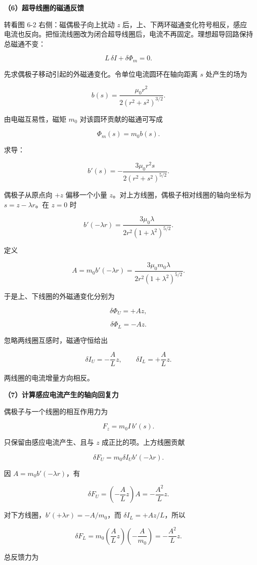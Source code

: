 \documentclass[12pt,a4paper,UTF8]{ctexart}
\begin{document}
\textbf{（6）超导线圈的磁通反馈}

转看图 6-2 右侧：磁偶极子向上扰动 \(z\)
后，上、下两环磁通变化符号相反，感应电流也反向。把恒流线圈改为闭合超导线圈后，电流不再固定。理想超导回路保持总磁通不变：

\[L\,\delta I+\delta\Phi_m=0.\]

先求偶极子移动引起的外磁通变化。令单位电流圆环在轴向距离 \(s\)
处产生的场为

\[
b(s)=\frac{\mu_0r^2}{2(r^2+s^2)^{3/2}}.
\]

由电磁互易性，磁矩 \(m_0\) 对该圆环贡献的磁通可写成

\[\Phi_m(s)=m_0b(s).\]

求导：

\[
b'(s)=-\frac{3\mu_0r^2s}
{2(r^2+s^2)^{5/2}}.
\]

偶极子从原点向 \(+z\) 偏移一个小量
\(z\)。对上方线圈，偶极子相对线圈的轴向坐标为 \(s=z-\lambda r\)。在
\(z=0\) 时

\[
b'(-\lambda r)
=\frac{3\mu_0\lambda}
{2r^2(1+\lambda^2)^{5/2}}.
\]

定义

\[
A=m_0b'(-\lambda r)
=\frac{3\mu_0m_0\lambda}
{2r^2(1+\lambda^2)^{5/2}}.
\]

于是上、下线圈的外磁通变化分别为

\[\delta\Phi_U=+Az,\]

\[\delta\Phi_L=-Az.\]

忽略两线圈互感时，磁通守恒给出

\[
\delta I_U=-\frac{A}{L}z,
\qquad
\delta I_L=+\frac{A}{L}z.
\]

两线圈的电流增量方向相反。

\textbf{（7）计算感应电流产生的轴向回复力}

偶极子与一个线圈的相互作用力为

\[F_z=m_0I\,b'(s).\]

只保留由感应电流产生、且与 \(z\) 成正比的项。上方线圈贡献

\[
\delta F_U
=m_0\delta I_U b'(-\lambda r).
\]

因 \(A=m_0b'(-\lambda r)\)，有

\[
\delta F_U
=\left(-\frac A Lz\right)A
=-\frac{A^2}{L}z.
\]

对下方线圈，\(b'(+\lambda r)=-A/m_0\)，而 \(\delta I_L=+Az/L\)，所以

\[
\delta F_L
=m_0\left(\frac A Lz\right)
\left(-\frac A{m_0}\right)
=-\frac{A^2}{L}z.
\]

总反馈力为
\end{document}
